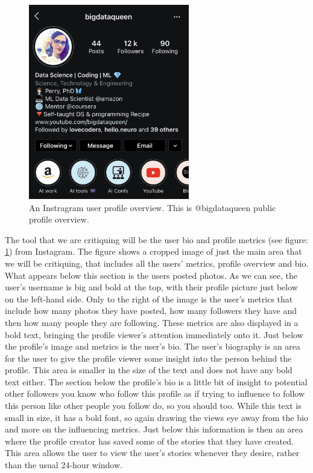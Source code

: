 \documentclass{sigchi}
\begin{document}
\begin{figure}
	\begin{center}
		\includegraphics[width=7cm]{instagram_example2.jpeg}
		\caption{An Instragram user profile overview. This is @bigdataqueen public profile overview.}
		\label{fig:instagram_overview}
	\end{center}
\end{figure}

	The tool that we are critiquing will be the user bio and profile metrics (see figure: \ref{fig:instagram_overview}) from Instagram. The figure shows a cropped image of just the main area that we will be critiquing, that includes all the users' metrics, profile overview and bio. What appears below this section is the users posted photos. As we can see, the user's username is big and bold at the top, with their profile picture just below on the left-hand side. Only to the right of the image is the user's metrics that include how many photos they have posted, how many followers they have and then how many people they are following. These metrics are also displayed in a bold text, bringing the profile viewer's attention immediately onto it. Just below the profile's image and metrics is the user's bio. The user's biography is an area for the user to give the profile viewer some insight into the person behind the profile. This area is smaller in the size of the text and does not have any bold text either. The section below the profile's bio is a little bit of insight to potential other followers you know who follow this profile as if trying to influence to follow this person like other people you follow do, so you should too. While this text is small in size, it has a bold font, so again drawing the views eye away from the bio and more on the influencing metrics. Just below this information is then an area where the profile creator has saved some of the stories that they have created. This area allows the user to view the user's stories whenever they desire, rather than the usual 24-hour window.
	
\end{document}

